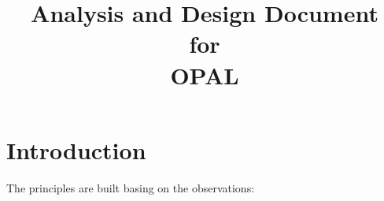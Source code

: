\documentclass{techreport}
\title{Analysis and Design Document \\ for \\ OPAL}
\begin{document}
\chapter{Introduction}
\par The principles are built basing on the observations:
\begin{itemize}

\end{itemize}
\end{document}
